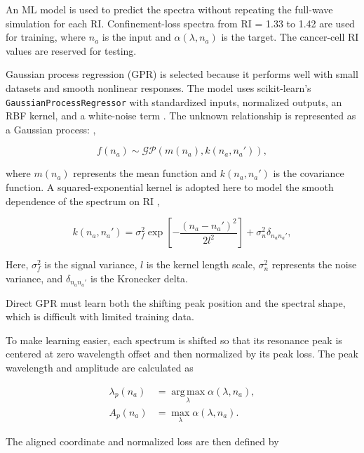 \documentclass[ACS,STIX2COL]{WileyNJD-v2}
\begin{document}
An ML model is used to predict the spectra without repeating the full-wave simulation for each RI. Confinement-loss spectra from RI = 1.33 to 1.42 are used for training, where $n_a$ is the input and $\alpha(\lambda,n_a)$ is the target. The cancer-cell RI values are reserved for testing.

Gaussian process regression (GPR) is selected because it performs well with small datasets and smooth nonlinear responses. The model uses scikit-learn's \texttt{GaussianProcessRegressor} with standardized inputs, normalized outputs, an RBF kernel, and a white-noise term \cite{pedregosa2011scikit}. The unknown relationship is represented as a Gaussian process: \cite{rasmussen2006gaussian},

\begin{equation}
f(n_a)\sim \mathcal{GP}\left(m(n_a),k(n_a,n_a')\right),
\label{eq:gpr_prior}
\end{equation}

where $m(n_a)$ represents the mean function and $k(n_a,n_a')$ is the covariance function. A squared-exponential kernel is adopted here to model the smooth dependence of the spectrum on RI \cite{rasmussen2006gaussian},

\begin{equation}
k(n_a,n_a')=\sigma_f^2\exp\left[-\frac{(n_a-n_a')^2}{2l^2}\right]+\sigma_n^2\delta_{n_a n_a'},
\label{eq:gpr_kernel}
\end{equation}

Here, $\sigma_f^2$ is the signal variance, $l$ is the kernel length scale, $\sigma_n^2$ represents the noise variance, and $\delta_{n_a n_a'}$ is the Kronecker delta.

Direct GPR must learn both the shifting peak position and the spectral shape, which is difficult with limited training data.

To make learning easier, each spectrum is shifted so that its resonance peak is centered at zero wavelength offset and then normalized by its peak loss. The peak wavelength and amplitude are calculated as

\begin{equation}
\begin{split}
\lambda_p(n_a) &= \operatorname*{arg\,max}_{\lambda}
\alpha(\lambda,n_a),\\
A_p(n_a) &= \max_{\lambda}\alpha(\lambda,n_a).
\end{split}
\label{eq:peak_extract}
\end{equation}

The aligned coordinate and normalized loss are then defined by
\end{document}
